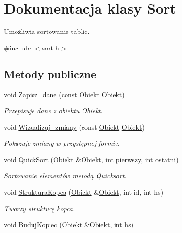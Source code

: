 \hypertarget{class_sort}{\section{\-Dokumentacja klasy \-Sort}
\label{class_sort}
}


\-Umożliwia sortowanie tablic.  




{\ttfamily \#include $<$sort.\-h$>$}

\subsection*{\-Metody publiczne}
\begin{DoxyCompactItemize}
\item 
void \hyperlink{class_sort_a54aa136bc24c37b9805621245eaab424}{\-Zapisz\-\_\-dane} (const \hyperlink{class_obiekt}{\-Obiekt} \hyperlink{class_obiekt}{\-Obiekt})
\begin{DoxyCompactList}\small\item\em \-Przepisuje dane z obiektu \hyperlink{class_obiekt}{\-Obiekt}. \end{DoxyCompactList}\item 
void \hyperlink{class_sort_ad1b1944c3335052502a9e8713057f764}{\-Wizualizuj\-\_\-zmiany} (const \hyperlink{class_obiekt}{\-Obiekt} \hyperlink{class_obiekt}{\-Obiekt})
\begin{DoxyCompactList}\small\item\em \-Pokazuje zmiany w przystępnej formie. \end{DoxyCompactList}\item 
void \hyperlink{class_sort_a99988d3b0122b194cdf0491f5d2cd968}{\-Quick\-Sort} (\hyperlink{class_obiekt}{\-Obiekt} \&\hyperlink{class_obiekt}{\-Obiekt}, int pierwszy, int ostatni)
\begin{DoxyCompactList}\small\item\em \-Sortowanie elementów metodą \-Quicksort. \end{DoxyCompactList}\item 
void \hyperlink{class_sort_a209a4cb0cc0015eaaabaa6b06bd9941e}{\-Struktura\-Kopca} (\hyperlink{class_obiekt}{\-Obiekt} \&\hyperlink{class_obiekt}{\-Obiekt}, int id, int hs)
\begin{DoxyCompactList}\small\item\em \-Tworzy strukturę kopca. \end{DoxyCompactList}\item 
void \hyperlink{class_sort_a3a4fbb23052f77aa5470f7ed2b016b20}{\-Buduj\-Kopiec} (\hyperlink{class_obiekt}{\-Obiekt} \&\hyperlink{class_obiekt}{\-Obiekt}, int hs)

\end{DoxyCompactItemize}
